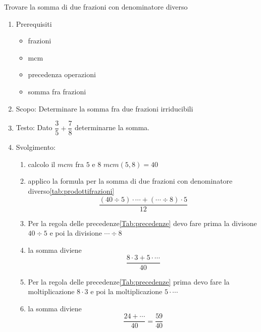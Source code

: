 \begin{table}[H]
	\caption{Trovare la somma di due frazioni con denominatore diverso}
	\label{tab:Trovaresommaduefrazionidenominatorediverso2}
\begin{enumerate}
	\item Prerequisiti 
\begin{itemize}
	\item frazioni
	\item mcm
	 \item precedenza operazioni
 \item somma fra frazioni
\end{itemize}
  \item Scopo: Determinare la somma fra due frazioni irriducibili
  \item Testo: Dato $\dfrac{3}{5}+\dfrac{7}{8}$  determinarne la somma.
  \item Svolgimento: 
  \begin{enumerate}
  \item calcolo il $mcm$ fra $5$ e $8$ $mcm(5,8)=40$
	\item applico la formula per la somma di due frazioni con denominatore diverso\nobs\vref{tab:prodottifrazioni} \[\dfrac{(40\div 5)\cdot \cdots+(\cdots\div 8)\cdot 5}{12}\]
	\item Per la regola delle precedenze\nobs\vref{Tab:precedenze} devo fare prima la divisone $40\div 5$ e poi la divisione $\cdots\div 8$
	\item la somma diviene \[\dfrac{8\cdot 3+5\cdot \cdots}{40}\]
	\item Per la regola delle precedenze\nobs\vref{Tab:precedenze} prima devo fare la moltiplicazione $8\cdot 3$ e poi la moltiplicazione $5\cdot\cdots$
	\item la somma diviene \[\dfrac{24+\cdots}{40}=\dfrac{59}{40}\]
 \end{enumerate}
  \end{enumerate}
\end{table}
